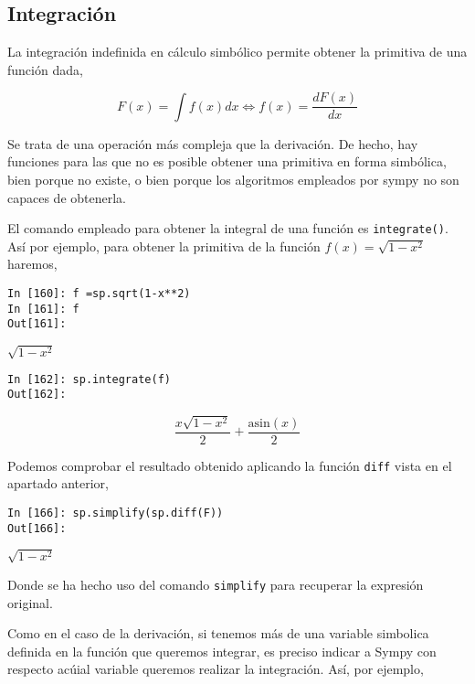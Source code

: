 \begin{paracol}{2}
\subsection{Integración} 
La integración indefinida en cálculo simbólico permite obtener la primitiva de una función dada,
\end{paracol}
\begin{equation*}
F(x) = \int f(x)dx  \Leftrightarrow f(x) = \frac{dF(x)}{dx}  
\end{equation*}
\begin{paracol}{2}
Se trata de una operación más compleja que la derivación. De hecho, hay funciones para las que no es posible obtener una primitiva en forma simbólica, bien porque no existe, o bien porque los algoritmos empleados por sympy no son capaces de obtenerla.

El comando empleado para obtener la integral de una función es \texttt{integrate()}. Así por ejemplo, para obtener la primitiva de la función $f(x) = \sqrt{1-x^2}$ haremos,
\end{paracol}
\begin{center}
	\begin{minipage}{.5\textwidth}
		\begin{verbatim}
In [160]: f =sp.sqrt(1-x**2)
In [161]: f
Out[161]: 
			\end{verbatim}
		$\sqrt{1-x^2}$
		\begin{verbatim}
In [162]: sp.integrate(f)
Out[162]: 
		\end{verbatim}
		\begin{equation*}
			\frac{x\sqrt{1-x^2}}{2}+\frac{\text{asin}(x)}{2}
		\end{equation*}
	\end{minipage}
\end{center}
\begin{paracol}{2}
Podemos comprobar el resultado obtenido aplicando la función \texttt{diff} vista en el apartado anterior,
\end{paracol}
\begin{center}
	\begin{minipage}{.5\textwidth}
		\begin{verbatim}
In [166]: sp.simplify(sp.diff(F))
Out[166]:  
		\end{verbatim}
			$\sqrt{1-x^2}$
	\end{minipage}
\end{center}
\begin{paracol}{2}
Donde se ha hecho uso del comando \texttt{simplify} para recuperar la expresión original.

Como en el caso de la derivación, si tenemos más de una variable simbolica definida en la función que queremos integrar, es preciso indicar a Sympy con respecto acúial variable queremos realizar la integración. Así, por ejemplo,
\end{paracol}
